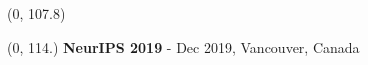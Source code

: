 \documentclass[final]{beamer}
\begin{document}
\begin{frame}{}
  \begin{textblock}{38}(0, 107.8)
    \small
    \begin{multicols}{2}
    \setlength\bibitemsep{8pt}
    \printbibliography[heading=none]
    \end{multicols}
  \end{textblock}

  \begin{textblock}{66}(0, 114.)
    \small
    \textbf{NeurIPS 2019}  -   Dec 2019, Vancouver, Canada\hfill
  \end{textblock}
  
\end{frame}
\end{document}
